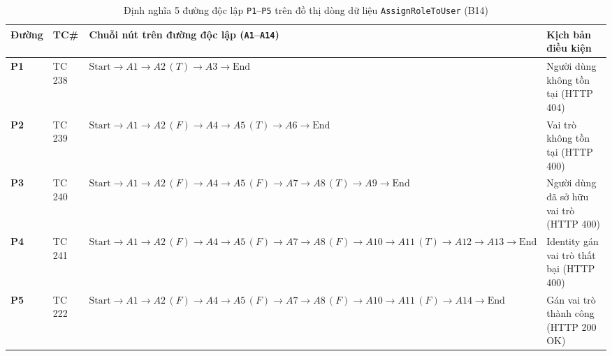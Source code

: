 \documentclass[11pt,a4paper]{article}
\begin{document}
\begin{table}[H]
\centering
\scriptsize
\setlength{\tabcolsep}{4pt}
\begin{tabularx}{\textwidth}{|C{1.1cm}|C{1.3cm}|X|L{4.2cm}|}
\hline
{}
\textbf{Đường} & \textbf{TC\#} & \textbf{Chuỗi nút trên đường độc lập (\texttt{A1}--\texttt{A14})} & \textbf{Kịch bản điều kiện} \tabularnewline
\hline
\textbf{P1} & TC 238 & $\text{Start} \rightarrow A1 \rightarrow A2\,(T) \rightarrow A3 \rightarrow \text{End}$ & Người dùng không tồn tại (HTTP 404) \\ \hline
\textbf{P2} & TC 239 & $\text{Start} \rightarrow A1 \rightarrow A2\,(F) \rightarrow A4 \rightarrow A5\,(T) \rightarrow A6 \rightarrow \text{End}$ & Vai trò không tồn tại (HTTP 400) \\ \hline
\textbf{P3} & TC 240 & $\text{Start} \rightarrow A1 \rightarrow A2\,(F) \rightarrow A4 \rightarrow A5\,(F) \rightarrow A7 \rightarrow A8\,(T) \rightarrow A9 \rightarrow \text{End}$ & Người dùng đã sở hữu vai trò (HTTP 400) \\ \hline
\textbf{P4} & TC 241 & $\text{Start} \rightarrow A1 \rightarrow A2\,(F) \rightarrow A4 \rightarrow A5\,(F) \rightarrow A7 \rightarrow A8\,(F) \rightarrow A10 \rightarrow A11\,(T) \rightarrow A12 \rightarrow A13 \rightarrow \text{End}$ & Identity gán vai trò thất bại (HTTP 400) \\ \hline
\textbf{P5} & TC 222 & $\text{Start} \rightarrow A1 \rightarrow A2\,(F) \rightarrow A4 \rightarrow A5\,(F) \rightarrow A7 \rightarrow A8\,(F) \rightarrow A10 \rightarrow A11\,(F) \rightarrow A14 \rightarrow \text{End}$ & Gán vai trò thành công (HTTP 200 OK) \\ \hline
\end{tabularx}
\caption{Định nghĩa 5 đường độc lập \texttt{P1}--\texttt{P5} trên đồ thị dòng dữ liệu \texttt{AssignRoleToUser} (B14)}
\end{table}
\end{document}
